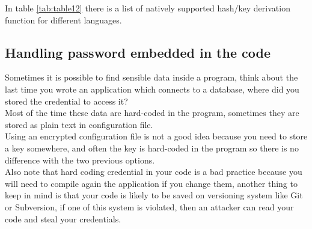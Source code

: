 In table \ref{tab:table12} there is a list of natively supported hash/key derivation function for different languages.\\



\subsection{Handling password embedded in the code}
Sometimes it is possible to find sensible data inside a program, think about the last time you wrote an application which connects to a database, where did you stored the credential to access it?\\
Most of the time these data are hard-coded in the program, sometimes they are stored as plain text in configuration file.\\
Using an encrypted configuration file is not a good idea because you need to store a key somewhere, and often the key is hard-coded in the program so there is no difference with the two previous options.\\

Also note that hard coding credential in your code is a bad practice because you will need to compile again the application if you change them, another thing to keep in mind is that your code is likely to be saved on versioning system like Git or Subversion, if one of this system is violated, then an attacker can read your code and steal your credentials.\\

